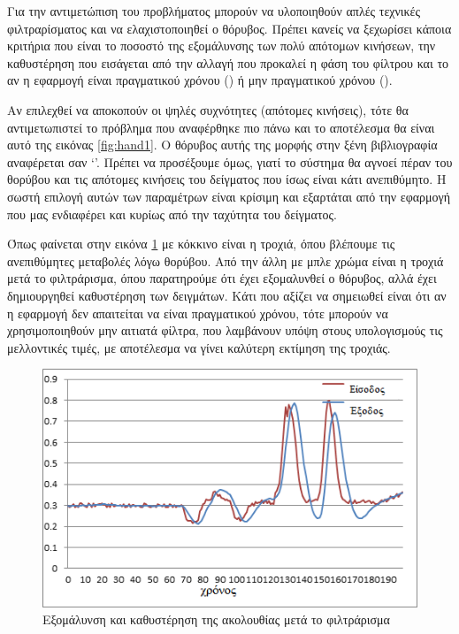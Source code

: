 Για την αντιμετώπιση του προβλήματος μπορούν να υλοποιηθούν απλές τεχνικές φιλτραρίσματος και να ελαχιστοποιηθεί ο θόρυβος. Πρέπει κανείς να ξεχωρίσει κάποια κριτήρια που είναι το ποσοστό της εξομάλυνσης των πολύ απότομων κινήσεων, την καθυστέρηση που εισάγεται από την αλλαγή που προκαλεί η φάση του φίλτρου και το αν η εφαρμογή είναι πραγματικού χρόνου () ή μην πραγματικού χρόνου ().

Αν επιλεχθεί να αποκοπούν οι ψηλές συχνότητες (απότομες κινήσεις), τότε θα αντιμετωπιστεί το πρόβλημα που αναφέρθηκε πιο πάνω και το αποτέλεσμα θα είναι αυτό της εικόνας \ref{fig:hand1}. Ο θόρυβος αυτής της μορφής στην ξένη βιβλιογραφία αναφέρεται σαν \lq {}\rq . Πρέπει να προσέξουμε όμως, γιατί το σύστημα θα αγνοεί πέραν του θορύβου και τις απότομες κινήσεις του δείγματος που ίσως είναι κάτι ανεπιθύμητο. Η σωστή επιλογή αυτών των παραμέτρων είναι κρίσιμη και εξαρτάται από την εφαρμογή που μας ενδιαφέρει και κυρίως από την ταχύτητα του δείγματος.

Όπως φαίνεται στην εικόνα \ref{fig:filter-latency} με κόκκινο είναι η τροχιά, όπου βλέπουμε τις ανεπιθύμητες μεταβολές λόγω θορύβου. Από την άλλη με μπλε χρώμα είναι η τροχιά μετά το φιλτράρισμα, όπου παρατηρούμε ότι έχει εξομαλυνθεί ο θόρυβος, αλλά έχει δημιουργηθεί καθυστέρηση των δειγμάτων. Κάτι που αξίζει να σημειωθεί είναι ότι αν η εφαρμογή δεν απαιτείται να είναι πραγματικού χρόνου, τότε μπορούν να χρησιμοποιηθούν μην αιτιατά φίλτρα, που λαμβάνουν υπόψη στους υπολογισμούς τις μελλοντικές τιμές, με αποτέλεσμα να γίνει καλύτερη εκτίμηση της τροχιάς.

\begin{figure}[h]
    \centering
    \includegraphics[width=.8\textwidth]{fig/filter-latency.png}
    \caption{Εξομάλυνση και καθυστέρηση της ακολουθίας μετά το φιλτράρισμα\protect\footnotemark}
    \label{fig:filter-latency}
\end{figure}

